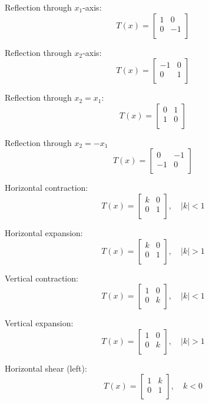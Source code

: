 \documentclass[12pt]{article} %
\begin{document}
Reflection through $x_1$-axis:
$$T(x) = \begin{bmatrix}
	1 & 0\\
	0 & -1\\
\end{bmatrix}$$

Reflection through $x_2$-axis:
$$T(x) = \begin{bmatrix}
	-1 & 0\\
	0 & 1\\
\end{bmatrix}$$

Reflection through $x_2 = x_1$:
$$T(x) = \begin{bmatrix}
	0 & 1\\
	1 & 0\\
\end{bmatrix}$$

Reflection through $x_2 = -x_1$
$$T(x) = \begin{bmatrix}
	0 & -1\\
	-1 & 0\\
\end{bmatrix}$$

Horizontal contraction:
$$T(x) = \begin{bmatrix}
	k & 0\\
	0 & 1\\
\end{bmatrix}, \quad |k| < 1$$

Horizontal expansion:
$$T(x) = \begin{bmatrix}
	k & 0\\
	0 & 1\\
\end{bmatrix}, \quad |k| > 1$$

Vertical contraction:
$$T(x) = \begin{bmatrix}
	1 & 0\\
	0 & k\\
\end{bmatrix}, \quad |k| < 1$$

Vertical expansion:
$$T(x) = \begin{bmatrix}
	1 & 0\\
	0 & k\\
\end{bmatrix}, \quad |k| > 1$$

Horizontal shear (left):
$$T(x) = \begin{bmatrix}
	1 & k\\
	0 & 1\\
\end{bmatrix}, \quad k < 0$$
\end{document}
